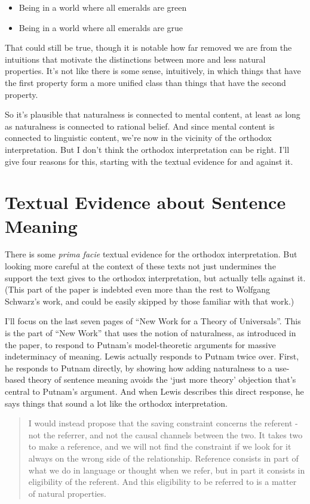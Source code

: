 \begin{itemize}
\item Being in a world where all emeralds are green
\item Being in a world where all emeralds are grue
\end{itemize}

\noindent That could still be true, though it is notable how far removed we are from the intuitions that motivate the distinctions between more and less natural properties. It's not like there is some sense, intuitively, in which things that have the first property form a more unified class than things that have the second property.

So it's plausible that naturalness is connected to mental content, at least as long as naturalness is connected to rational belief. And since mental content is connected to linguistic content, we're now in the vicinity of the orthodox interpretation. But I don't think the orthodox interpretation can be right. I'll give four reasons for this, starting with the textual evidence for and against it.

\section{Textual Evidence about Sentence Meaning}

There is some \textit{prima facie} textual evidence for the orthodox interpretation. But looking more careful at the context of these texts not just undermines the support the text gives to the orthodox interpretation, but actually tells against it. (This part of the paper is indebted even more than the rest to Wolfgang Schwarz's work, and could be easily skipped by those familiar with that work.)

I'll focus on the last seven pages of ``New Work for a Theory of Universals''. This is the part of ``New Work'' that uses the notion of naturalness, as introduced in the paper, to respond to Putnam's model-theoretic arguments for massive indeterminacy of meaning. Lewis actually responds to Putnam twice over. First, he responds to Putnam directly, by showing how adding naturalness to a use-based theory of sentence meaning avoids the `just more theory' objection that's central to Putnam's argument. And when Lewis describes this direct response, he says things that sound a lot like the orthodox interpretation.

\begin{quote}
I would instead propose that the saving constraint concerns the referent - not the referrer, and not the causal channels between the two. It takes two to make a reference, and we will not find the constraint if we look for it always on the wrong side of the relationship. Reference consists in part of what we do in language or thought when we refer, but in part it consists in eligibility of the referent. And this eligibility to be referred to is a matter of natural properties. \citep[371]{Lewis1983e}
\end{quote}

